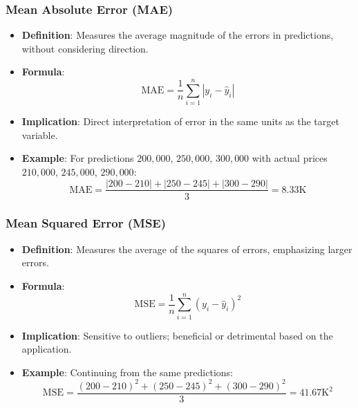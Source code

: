 \documentclass{beamer}
\begin{document}
\begin{frame}[fragile]
    \frametitle{Mean Absolute Error (MAE)}
    \begin{itemize}
        \item \textbf{Definition}: Measures the average magnitude of the errors in predictions, without considering direction.
        
        \item \textbf{Formula}:  
        \begin{equation}
            \text{MAE} = \frac{1}{n} \sum_{i=1}^{n} |y_i - \hat{y}_i|
        \end{equation}
        
        \item \textbf{Implication}: Direct interpretation of error in the same units as the target variable.

        \item \textbf{Example}: For predictions $200,000$, $250,000$, $300,000$ with actual prices $210,000$, $245,000$, $290,000$:
        \begin{equation}
            \text{MAE} = \frac{|200 - 210| + |250 - 245| + |300 - 290|}{3} = 8.33\text{K}
        \end{equation}
    \end{itemize}
\end{frame}

\begin{frame}[fragile]
    \frametitle{Mean Squared Error (MSE)}
    \begin{itemize}
        \item \textbf{Definition}: Measures the average of the squares of errors, emphasizing larger errors.
        
        \item \textbf{Formula}:  
        \begin{equation}
            \text{MSE} = \frac{1}{n} \sum_{i=1}^{n} (y_i - \hat{y}_i)^2
        \end{equation}
        
        \item \textbf{Implication}: Sensitive to outliers; beneficial or detrimental based on the application.

        \item \textbf{Example}: Continuing from the same predictions:
        \begin{equation}
            \text{MSE} = \frac{(200 - 210)^2 + (250 - 245)^2 + (300 - 290)^2}{3} = 41.67\text{K}^{2}
        \end{equation}
    \end{itemize}
\end{frame}
\end{document}
